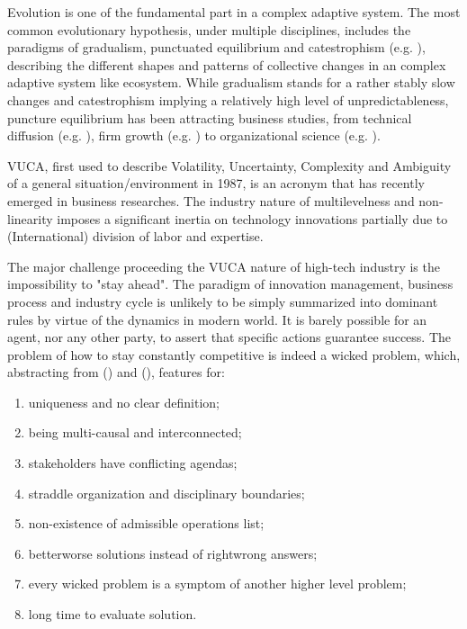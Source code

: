 \documentclass[utf8,english]{gradu3}
\begin{document}
Evolution is one of the fundamental part in a complex adaptive system. The most common evolutionary hypothesis, under multiple disciplines, includes the paradigms of gradualism, punctuated equilibrium and catestrophism (e.g. \cite{gould1972punctuated}), describing the different shapes and patterns of collective changes in an complex adaptive system like ecosystem. While gradualism stands for a rather stably slow changes and catestrophism implying a relatively high level of unpredictableness, puncture equilibrium has been attracting business studies, from technical diffusion (e.g. \cite{loch1999punctuated}),  firm growth (e.g. \cite{mudambi2011proactive}) to organizational science (e.g. \cite{romanelli1994organizational}).

VUCA, first used to describe Volatility, Uncertainty, Complexity and Ambiguity of a general situation/environment in 1987, is an acronym that has recently emerged in business researches. The industry nature of multilevelness and non-linearity imposes a significant inertia on technology innovations partially due to (International) division of labor and expertise.

The major challenge proceeding the VUCA nature of high-tech industry is the impossibility to "stay ahead". The paradigm of innovation management, business process and industry cycle is unlikely to be simply summarized into dominant rules by virtue of the dynamics in modern world. It is barely possible for an agent, nor any other party, to assert that specific actions guarantee success. The problem of how to stay constantly competitive is indeed a wicked problem, which, abstracting from \citeauthor{rittel1974wicked} (\citeyear{rittel1974wicked}) and \citeauthor{buchanan1992wicked} (\citeyear{buchanan1992wicked}), features for:

\begin{enumerate}
    \item uniqueness and no clear definition;
    \item being multi-causal and interconnected;
    \item stakeholders have conflicting agendas;
    \item straddle organization and disciplinary boundaries;
    \item non-existence of admissible operations list;
    \item better\/worse solutions instead of right\/wrong answers;
    \item every wicked problem is a symptom of another higher level problem;
    \item long time to evaluate solution.
\end{enumerate}
\end{document}
